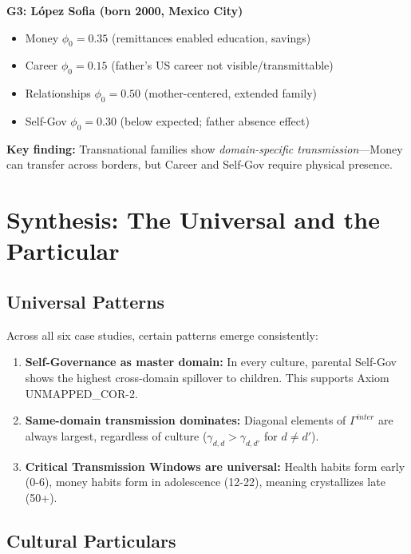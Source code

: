 \textbf{G3: López Sofia (born 2000, Mexico City)}
\begin{itemize}[nosep]
\item Money $\phi_0 = 0.35$ (remittances enabled education, savings)
\item Career $\phi_0 = 0.15$ (father's US career not visible/transmittable)
\item Relationships $\phi_0 = 0.50$ (mother-centered, extended family)
\item Self-Gov $\phi_0 = 0.30$ (below expected; father absence effect)
\end{itemize}

\textbf{Key finding:} Transnational families show \textit{domain-specific transmission}---Money can
transfer across borders, but Career and Self-Gov require physical presence.


\section{Synthesis: The Universal and the Particular}
\label{sec:BI-synthesis}

\subsection{Universal Patterns}

Across all six case studies, certain patterns emerge consistently:

\begin{enumerate}
\item \textbf{Self-Governance as master domain:} In every culture, parental Self-Gov shows
the highest cross-domain spillover to children. This supports Axiom UNMAPPED_COR-2.

\item \textbf{Same-domain transmission dominates:} Diagonal elements of $\Gamma^{inter}$ are
always largest, regardless of culture ($\gamma_{d,d} > \gamma_{d,d'}$ for $d \neq d'$).

\item \textbf{Critical Transmission Windows are universal:} Health habits form early (0-6),
money habits form in adolescence (12-22), meaning crystallizes late (50+).
\end{enumerate}

\subsection{Cultural Particulars}

